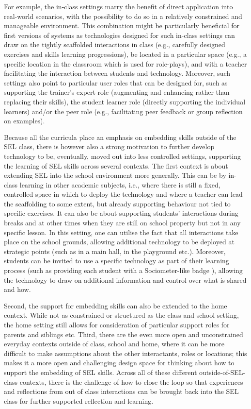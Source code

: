 \documentclass[prodmode,acmtochi]{acmsmall}
\begin{document}
For example, the in-class settings marry the benefit of direct application into real-world scenarios, with the possibility to do so in a relatively constrained and manageable environment. This combination might be particularly beneficial for first versions of systems as technologies designed for such in-class settings can draw on the tightly scaffolded interactions in class (e.g., carefully designed exercises and skills learning progressions), be located in a particular space (e.g., a specific location in the classroom which is used for role-plays), and with a teacher facilitating the interaction between students and technology.  Moreover, such settings also point to particular user roles that can be designed for, such as supporting the trainer's expert role (augmenting and enhancing rather than replacing their skills), the student learner role (directly supporting the individual learners) and/or the peer role (e.g., facilitating peer feedback or group reflection on examples). 

Because all the curricula place an emphasis on embedding skills outside of the SEL class, there is however also a strong motivation to further develop technology to be, eventually, moved out into less controlled settings,  supporting the learning of SEL skills across several contexts. The first context is about extending SEL into the school environment more generally. This can be by in-class learning in other academic subjects, i.e., where there is still a fixed, controlled space in which to deploy the technology and where a teacher can lead the scaffolding to some extent, but already supporting behaviour not tied to specific exercises. It can also be about supporting students' interactions during breaks and at other times when they are still on school property but not in any specific lesson. In this setting, one can utilise the fact that all interactions take place on the school grounds, allowing additional technology to be deployed at strategic points (such as in a main hall, in the playground etc.). Moreover, students can be invited to use a specific technology as part of their learning process (such as providing each student with a Sociometer-like badge \cite{Kim2008}), allowing the technology to draw on additional information and control over what is shared and how. 
%

Second, the support for embedding skills can also be extended to the home context. While not as constrained or structured as the class and school setting, the home setting still allows for consideration of particular support roles for parents and siblings etc. Third, there are the even more open and unconstrained everyday contexts outside of class, school and home, where it can be more difficult to make assumptions about the other interactants, roles or locations; this makes it a more open and challenging design space for thinking about how to support the embedding of SEL skills. Across all of these different outside-of-SEL-class contexts, there is the challenge of how to close the loop so that experiences and reflections from out of class interactions can be brought back into the SEL class for further supported reflection and learning.
\end{document}
